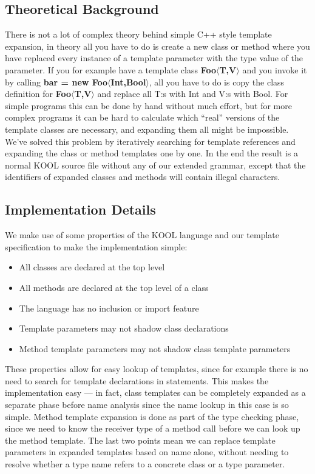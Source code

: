 \subsection{Theoretical Background}

There is not a lot of complex theory behind simple C++ style template expansion, in theory all you
have to do is create a new class or method where you have replaced every instance of a template
parameter with the type value of the parameter.  If you for example have a template class
\textbf{Foo$\langle$T,V$\rangle$} and you invoke it by calling \textbf{bar = new
Foo$\langle$Int,Bool$\rangle$}, all you have to do is copy the class definition for
\textbf{Foo$\langle$T,V$\rangle$} and replace all T:s with Int and V:s with Bool. For simple
programs this can be done by hand without much effort, but for more complex programs it can be hard
to calculate which ``real'' versions of the template classes are necessary, and expanding them all
might be impossible. We've solved this problem by iteratively searching for template references and
expanding the class or method templates one by one. In the end the result is a normal KOOL source
file without any of our extended grammar, except that the identifiers of expanded classes and
methods will contain illegal characters.

\subsection{Implementation Details}

We make use of some properties of the KOOL language and our template specification to make the
implementation simple:

\begin{itemize}
    \item All classes are declared at the top level
    \item All methods are declared at the top level of a class
    \item The language has no inclusion or import feature
    \item Template parameters may not shadow class declarations
    \item Method template parameters may not shadow class template parameters
\end{itemize}

These properties allow for easy lookup of templates, since for example there is no need to search
for template declarations in statements. This makes the implementation easy --- in fact, class
templates can be completely expanded as a separate phase before name analysis since the name lookup
in this case is so simple. Method template expansion is done as part of the type checking phase,
since we need to know the receiver type of a method call before we can look up the method template.
The last two points mean we can replace template parameters in expanded templates based on name
alone, without needing to resolve whether a type name refers to a concrete class or a type
parameter.

